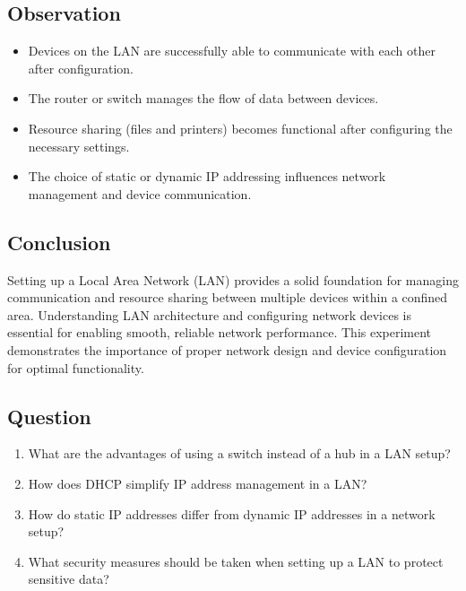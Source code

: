 \documentclass[a4paper,9pt]{article}
\begin{document}
\subsection{Observation}
\begin{itemize}
	\item Devices on the LAN are successfully able to communicate with each other after configuration.
	
	
	\item The router or switch manages the flow of data between devices.
	\item Resource sharing (files and printers) becomes functional after configuring the necessary settings.
	\item The choice of static or dynamic IP addressing influences network management and device communication.
\end{itemize}
\subsection{Conclusion}
Setting up a Local Area Network (LAN) provides a solid foundation for managing communication and resource sharing between multiple devices within a confined area. Understanding LAN architecture and configuring network devices is essential for enabling smooth, reliable network performance. This experiment demonstrates the importance of proper network design and device configuration for optimal functionality.

\subsection{Question}

\begin{enumerate}
	\item What are the advantages of using a switch instead of a hub in a LAN setup?
	
	\item How does DHCP simplify IP address management in a LAN?
	\item How do static IP addresses differ from dynamic IP addresses in a network setup?
	\item What security measures should be taken when setting up a LAN to protect sensitive data?
	
\end{enumerate}

\newpage
	
\end{document}
